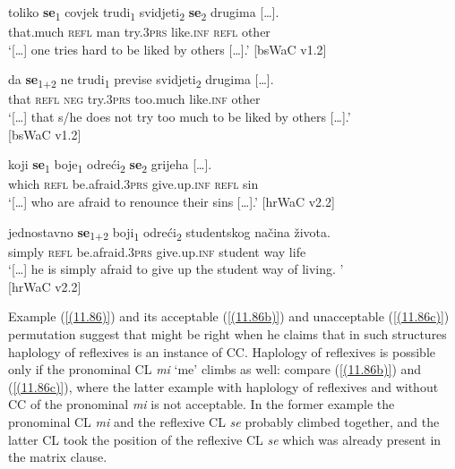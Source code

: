 \begin{exe}\ex\label{(11.82)}
\gll [\dots] toliko \textbf{se}\textsubscript{1} covjek trudi\textsubscript{1} svidjeti\textsubscript{2} \textbf{se}\textsubscript{2} {drugima [\dots].} \\
{} that.much \textsc{refl} man try.3\textsc{prs} like.\textsc{inf} \textsc{refl} other \\
\glt ‘[\dots] one tries hard to be liked by others [\dots].’
\hfill [bsWaC v1.2]

\ex\label{(11.83)}
\gll [\dots] da \textbf{se}\textsubscript{1$+$2} ne trudi\textsubscript{1} previse svidjeti\textsubscript{2} {drugima [\dots].} \\
{} that \textsc{refl} \textsc{neg} try.3\textsc{prs} too.much like.\textsc{inf} other \\
\glt ‘[\dots] that s/he does not try too much to be liked by others [\dots].’ \\
\hfill [bsWaC v1.2]

\ex\label{(11.84)}
\gll [\dots] koji \textbf{se}\textsubscript{1} boje\textsubscript{1} odreći\textsubscript{2} \textbf{se}\textsubscript{2} {grijeha [\dots].} \\
{} which \textsc{refl} be.afraid.3\textsc{prs} give.up.\textsc{inf} \textsc{refl} sin \\
\glt ‘[\dots] who are afraid to renounce their sins [\dots].’
\hfill [hrWaC v2.2]

\ex\label{(11.85)}
\gll [\dots] jednostavno \textbf{se}\textsubscript{1$+$2} boji\textsubscript{1} odreći\textsubscript{2} studentskog načina života.\\
{} simply \textsc{refl} be.afraid.3\textsc{prs} give.up.\textsc{inf} student way life\\
\glt ‘[\dots] he is simply afraid to give up the student way of living. ’ \\
\hfill [hrWaC v2.2]
\end{exe}

\noindent Example (\ref{(11.86)}) and its acceptable (\ref{(11.86b)}) and unacceptable (\ref{(11.86c)}) permutation suggest that \citet[106, 114]{Rosen14} might be right when he claims that in such structures haplology of reflexives is an instance of CC. Haplology of reflexives is possible only if the pronominal CL \textit{mi} ‘me’ climbs as well: compare (\ref{(11.86b)}) and (\ref{(11.86c)}), where the latter example with haplology of reflexives and without CC of the pronominal \textit{mi} is not acceptable. In the former example the pronominal CL \textit{mi} and the reflexive CL \textit{se} probably climbed together, and the latter CL took the position of the reflexive CL \textit{se} which was already present in the matrix clause. 

